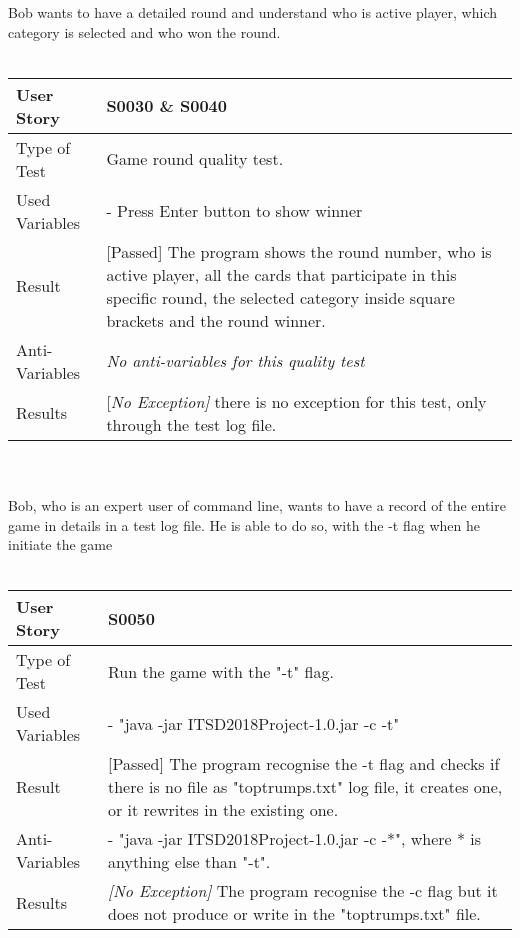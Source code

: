 Bob wants to have a detailed round and understand who is active player, which category is selected and who won the round.\\
\vspace{0.2cm}\\
\begin{tabular}{l | p{12cm}}
User Story & \textbf{S0030} \& \textbf{S0040} \\ \hline
Type of Test & Game round quality test.\\ \hline
Used Variables & - Press Enter button to show winner\\ \hline
Result & [Passed] The program shows the round number, who is active player, all the cards that participate in this specific round, the selected category inside square brackets and the round winner.\\ \hline
Anti-Variables & \textit{No anti-variables for this quality test} \\ \hline
Results & [\textit{No Exception]} there is no exception for this test, only through the test log file. \\ \hline
\end{tabular}\\
\vspace{0.2cm}\\
Bob, who is an expert user of command line, wants to have a record of the entire game in details in a test log file. He is able to do so, with the -t flag when he initiate the game\\
\vspace{0.2cm}\\
\begin{tabular}{l | p{12cm}}
User Story & \textbf{S0050}\\ \hline
Type of Test & Run the game with the "-t" flag.\\ \hline
Used Variables & - "java -jar ITSD2018Project-1.0.jar -c -t"\\ \hline
Result & [Passed] The program recognise the -t flag and checks if there is no file as "toptrumps.txt" log file, it creates one, or it rewrites in the existing one.\\ \hline
Anti-Variables & - "java -jar ITSD2018Project-1.0.jar -c -*", where * is anything else than "-t".\\ \hline
Results & \textit{[No Exception]} The program recognise the -c flag but it does not produce or write in the "toptrumps.txt" file. \\ \hline
\end{tabular}\\
